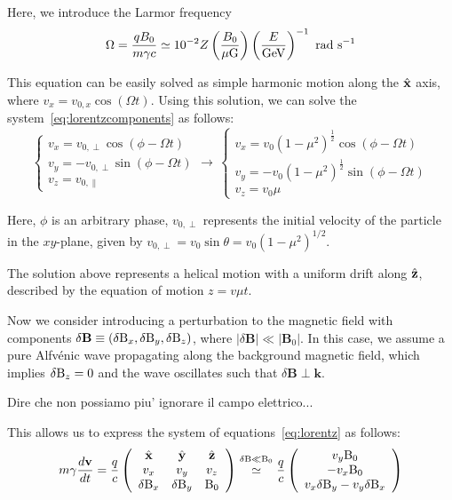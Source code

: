 Here, we introduce the Larmor frequency 
\begin{equation}
\Omega = \frac{q B_0}{m \gamma c} \simeq 10^{-2} Z \left(\frac{B_0}{\rm \mu G}\right) \left(\frac{E}{\rm GeV}\right)^{-1}~\text{rad}~\text{s}^{-1}
\end{equation}

This equation can be easily solved as simple harmonic motion along the $\hat{\vb x}$ axis, where $v_{x} = v_{0,x} \cos (\Omega t)$. Using this solution, we can solve the system~\eqref{eq:lorentzcomponents} as follows:
%
\begin{equation}
\begin{cases}
v_x = v_{0,\perp} \cos (\phi - \Omega t) \\
v_y = - v_{0,\perp} \sin (\phi - \Omega t) \\
v_z = v_{0,\parallel}
\end{cases}
\rightarrow \, 
\begin{cases}
v_x = v_{0} (1 - \mu^2)^{\frac{1}{2}} \cos (\phi - \Omega t) \\
v_y = - v_{0} (1 - \mu^2)^{\frac{1}{2}} \sin (\phi - \Omega t) \\
v_z = v_{0} \mu
\end{cases}
\end{equation}

Here, $\phi$ is an arbitrary phase, $v_{0,\perp}$ represents the initial velocity of the particle in the $xy$-plane, given by $v_{0,\perp} = v_0 \sin \theta = v_0 (1-\mu^2)^{1/2}$.

The solution above represents a helical motion with a uniform drift along $\hat{\vb z}$, described by the equation of motion $z = v \mu t$.

Now we consider introducing a perturbation to the magnetic field with components $\delta \mathbf{B} \equiv (\delta {\rm B}_x, \delta {\rm B}_y, \delta {\rm B}_z)$, where $|\delta \mathbf{B}| \ll |\mathbf{B}_0|$. In this case, we assume a pure Alfvénic wave propagating along the background magnetic field, which implies $\delta {\rm B}_z = 0$ and the wave oscillates such that $\delta \mathbf{B} \perp \mathbf{k}$.

{\color{red}Dire che non possiamo piu' ignorare il campo elettrico...}

This allows us to express the system of equations~\eqref{eq:lorentz} as follows:
%
\begin{equation}
m \gamma \frac{d\vb v}{dt} = \frac{q}{c}
\left(
\begin{array}{ccc}
\hat {\vb x}  & \hat {\vb y}  & \hat {\vb z}  \\
v_x & v_y & v_z \\
\delta {\rm B}_x & \delta {\rm B}_y & {\rm B}_0 
\end{array}
\right)
\oset{\delta {\rm B} \ll {\rm B}_0} \simeq
\frac{q}{c}
\left(
\begin{array}{c}
v_y {\rm B}_0 \\
-v_x {\rm B}_0 \\
v_x \delta {\rm B}_y - v_y \delta {\rm B}_x
\end{array}
\right)
\end{equation}


